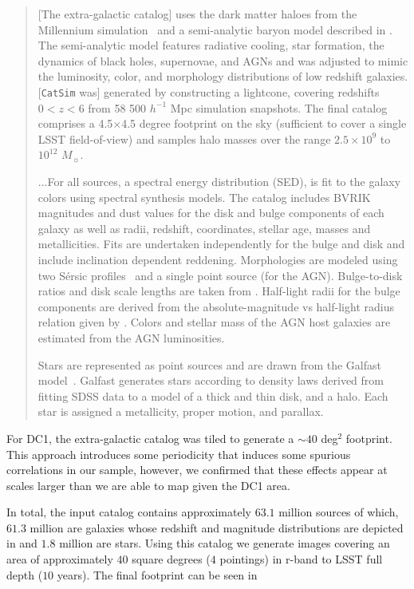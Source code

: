 \documentclass[\docopts]{\docclass}
\begin{document}
\begin{quote}
[The extra-galactic catalog] uses the dark matter haloes from the Millennium simulation~\citep{2005Nature.435.629S} and a semi-analytic baryon model described in \citet{2006MNRAS.366..499D}. The semi-analytic model features radiative cooling, star formation, the dynamics of black holes, supernovae, and AGNs and was adjusted to mimic the luminosity, color, and morphology distributions of low redshift galaxies.  [\texttt{CatSim} was] generated by constructing a lightcone, covering redshifts $0<z<6$ from 58 500 $h^{-1}$ Mpc simulation snapshots. The final catalog comprises a 4.5$\times$4.5 degree footprint on the sky (sufficient to cover a single LSST field-of-view) and samples halo masses over the range $2.5\times10^{9}$ to $10^{12}$ $M_{\sun}$.

...For all sources, a spectral energy distribution (SED), is fit to the galaxy colors using \citet{2003MNRAS.344.1000B} spectral synthesis models. The \citet{2006MNRAS.366..499D} catalog includes BVRIK magnitudes and dust values for the disk and bulge components of each galaxy as well as radii, redshift, coordinates, stellar age, masses and metallicities. Fits are undertaken independently for the bulge and disk and include inclination dependent reddening. Morphologies are modeled using two S\'{e}rsic profiles~\citep{1963BAAA....6...41S} and a single point source (for the AGN). Bulge-to-disk ratios and disk scale lengths are taken from \citep{2006MNRAS.366..499D}. Half-light radii for the bulge components are derived from the absolute-magnitude vs half-light radius relation given by \citet{2011A&A...534A...3G}. Colors and stellar mass of the AGN host galaxies are estimated from the AGN luminosities.

Stars are represented as point sources and are drawn from the Galfast model~\citep{2008ApJ...673..864J}. Galfast generates stars according to density laws derived from fitting SDSS data to a model of a thick and thin disk, and a halo. Each star is assigned a metallicity, proper motion, and parallax. 
\end{quote}

For DC1, the extra-galactic catalog was tiled to generate a $\sim 40$ deg$^{2}$ footprint. This approach introduces some periodicity that induces some spurious correlations in our sample, however, we confirmed that these effects appear at scales larger than we are able to map given the DC1 area.

In total, the input catalog contains approximately $63.1$ million sources of which, $61.3$ million are galaxies whose redshift and magnitude distributions are depicted in  and $1.8$ million are stars. Using this catalog we generate images covering an area of approximately $40$ square degrees ($4$ pointings) in r-band to LSST full depth ($10$ years). The final footprint can be seen in 
\end{document}
